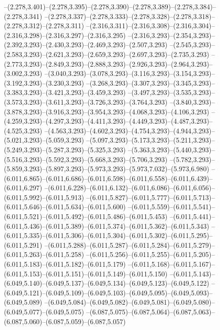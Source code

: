   --(2.278,3.401)--(2.278,3.395)--(2.278,3.390)--(2.278,3.389)--(2.278,3.384)--(2.278,3.341)%
  --(2.278,3.337)--(2.278,3.333)--(2.278,3.328)--(2.278,3.318)--(2.278,3.312)--(2.278,3.311)%
  --(2.316,3.311)--(2.316,3.308)--(2.316,3.304)--(2.316,3.298)--(2.316,3.297)--(2.316,3.295)%
  --(2.316,3.293)--(2.354,3.293)--(2.392,3.293)--(2.430,3.293)--(2.469,3.293)--(2.507,3.293)%
  --(2.545,3.293)--(2.583,3.293)--(2.621,3.293)--(2.659,3.293)--(2.697,3.293)--(2.735,3.293)%
  --(2.773,3.293)--(2.849,3.293)--(2.888,3.293)--(2.926,3.293)--(2.964,3.293)--(3.002,3.293)%
  --(3.040,3.293)--(3.078,3.293)--(3.116,3.293)--(3.154,3.293)--(3.192,3.293)--(3.230,3.293)%
  --(3.268,3.293)--(3.307,3.293)--(3.345,3.293)--(3.383,3.293)--(3.421,3.293)--(3.459,3.293)%
  --(3.497,3.293)--(3.535,3.293)--(3.573,3.293)--(3.611,3.293)--(3.726,3.293)--(3.764,3.293)%
  --(3.840,3.293)--(3.878,3.293)--(3.916,3.293)--(3.954,3.293)--(4.068,3.293)--(4.106,3.293)%
  --(4.259,3.293)--(4.297,3.293)--(4.411,3.293)--(4.449,3.293)--(4.487,3.293)--(4.525,3.293)%
  --(4.563,3.293)--(4.602,3.293)--(4.754,3.293)--(4.944,3.293)--(5.021,3.293)--(5.059,3.293)%
  --(5.097,3.293)--(5.173,3.293)--(5.211,3.293)--(5.249,3.293)--(5.287,3.293)--(5.325,3.293)%
  --(5.363,3.293)--(5.440,3.293)--(5.516,3.293)--(5.592,3.293)--(5.668,3.293)--(5.706,3.293)%
  --(5.782,3.293)--(5.859,3.293)--(5.897,3.293)--(5.973,3.293)--(5.973,7.032)--(5.973,6.980)%
  --(6.011,6.865)--(6.011,6.686)--(6.011,6.598)--(6.011,6.558)--(6.011,6.439)--(6.011,6.297)%
  --(6.011,6.228)--(6.011,6.132)--(6.011,6.086)--(6.011,6.056)--(6.011,5.992)--(6.011,5.913)%
  --(6.011,5.827)--(6.011,5.777)--(6.011,5.713)--(6.011,5.646)--(6.011,5.634)--(6.011,5.600)%
  --(6.011,5.559)--(6.011,5.541)--(6.011,5.521)--(6.011,5.492)--(6.011,5.486)--(6.011,5.453)%
  --(6.011,5.441)--(6.011,5.436)--(6.011,5.389)--(6.011,5.374)--(6.011,5.362)--(6.011,5.343)%
  --(6.011,5.335)--(6.011,5.306)--(6.011,5.304)--(6.011,5.302)--(6.011,5.295)--(6.011,5.291)%
  --(6.011,5.288)--(6.011,5.287)--(6.011,5.284)--(6.011,5.279)--(6.011,5.263)--(6.011,5.258)%
  --(6.011,5.256)--(6.011,5.255)--(6.011,5.205)--(6.011,5.183)--(6.011,5.182)--(6.011,5.179)%
  --(6.011,5.168)--(6.011,5.167)--(6.011,5.153)--(6.011,5.151)--(6.011,5.149)--(6.011,5.150)%
  --(6.011,5.143)--(6.049,5.140)--(6.049,5.137)--(6.049,5.134)--(6.049,5.123)--(6.049,5.122)%
  --(6.049,5.121)--(6.049,5.109)--(6.049,5.103)--(6.049,5.095)--(6.049,5.093)--(6.049,5.089)%
  --(6.049,5.084)--(6.049,5.082)--(6.049,5.081)--(6.049,5.080)--(6.049,5.077)--(6.049,5.075)%
  --(6.087,5.075)--(6.087,5.064)--(6.087,5.063)--(6.087,5.060)--(6.087,5.059)--(6.087,5.057)%
